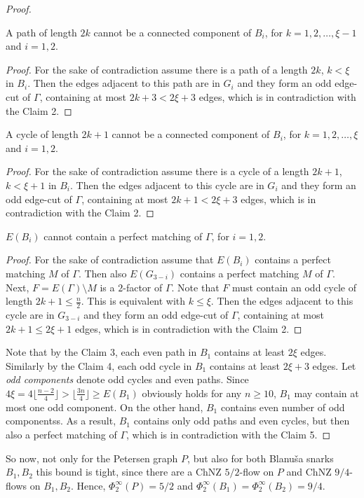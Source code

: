 \begin{proof}
    \begin{claim}
        A path of length $2k$ cannot be a connected component of $B_i$, for $k=1,2,\dots, \xi-1$ and $i = 1, 2$.
    \end{claim}
    \begin{proof}
        For the sake of contradiction assume there is a path of a length $2k$, $k<\xi$ in $B_i$. Then the edges adjacent to this path are in $G_i$ and they form an odd edge-cut of $\Gamma$, containing at most $2k+3<2\xi+3$ edges, which is in contradiction with the Claim 2.
    \end{proof}

    \begin{claim}
        A cycle of length $2k+1$ cannot be a connected component of $B_i$, for $k=1,2,\dots, \xi$ and $i = 1, 2$.
    \end{claim}
    \begin{proof}
        For the sake of contradiction assume there is a cycle of a length $2k+1$, $k<\xi+1$ in $B_i$. Then the edges adjacent to this cycle are in $G_i$ and they form an odd edge-cut of $\Gamma$, containing at most $2k+1<2\xi+3$ edges, which is in contradiction with the Claim 2.
    \end{proof}

    \begin{claim}
        $E(B_i)$ cannot contain a perfect matching of $\Gamma$, for $i = 1, 2$.
    \end{claim}
    \begin{proof}
        For the sake of contradiction assume that $E(B_i)$ contains a perfect matching $M$ of $\Gamma$. Then also $E(G_{3-i})$ contains a perfect matching $M$ of $\Gamma$. Next, $F=E(\Gamma)\setminus M$ is a $2$-factor of $\Gamma$. Note that $F$ must contain an odd cycle of length $2k+1\leq\frac n2$. This is equivalent with $k\leq\xi$. Then the edges adjacent to this cycle are in $G_{3-i}$ and they form an odd edge-cut of $\Gamma$, containing at most $2k+1\leq 2\xi+1$ edges, which is in contradiction with the Claim 2.
    \end{proof}

    Note that by the Claim 3, each even path in $B_1$ contains at least $2\xi$ edges. Similarly by the Claim 4, each odd cycle in $B_1$ contains at least $2\xi+3$ edges. Let \emph{odd components} denote odd cycles and even paths. Since $4\xi=4\lfloor\frac{n-2}{4}\rfloor>\lfloor\frac{3n}{4}\rfloor\geq E(B_1)$ obviously holds for any $n\geq 10$, $B_1$ may contain at most one odd component. On the other hand, $B_1$ contains even number of odd componentss. As a result, $B_1$ contains only odd paths and even cycles, but then also a perfect matching of $\Gamma$, which is in contradiction with the Claim 5.
\end{proof}

So now, not only for the Petersen graph $P$, but also for both Blanuša snarks $B_1, B_2$ this bound is tight, since there are a ChNZ $5/2$-flow on $P$ and ChNZ $9/4$-flows on $B_1, B_2$. Hence, $\Phi_2^\infty(P)=5/2$ and $\Phi_2^\infty(B_1)=\Phi_2^\infty(B_2)=9/4$.
